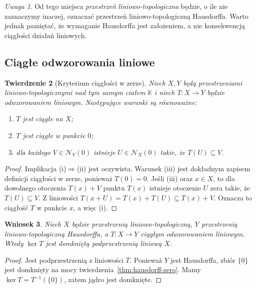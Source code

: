 \documentclass[11pt,a4paper]{article}
\numberwithin{equation}{section}
\theoremstyle{plain}
\newtheorem{twierdzenie}{Twierdzenie}[section]
\newtheorem{wniosek}[twierdzenie]{Wniosek}
\theoremstyle{definition}
\theoremstyle{remark}
\newtheorem{uwaga}[twierdzenie]{Uwaga}
\newcommand{\K}{\mathbb K}
\begin{document}
\begin{uwaga}
Od tego miejsca \emph{przestrzeń liniowo-topologiczna} będzie,
o ile nie zaznaczymy inaczej, oznaczać przestrzeń liniowo-topologiczną
Hausdorffa. Warto jednak pamiętać, że wymaganie Hausdorffa jest
założeniem, a nie konsekwencją ciągłości działań liniowych.
\end{uwaga}

\subsection{Ciągłe odwzorowania liniowe}

\begin{twierdzenie}[Kryterium ciągłości w zerze]\label{thm:linear-continuity-zero}
Niech $X,Y$ będą przestrzeniami liniowo-topologicznymi nad tym samym
ciałem $\K$ i niech $T\colon X\to Y$ będzie odwzorowaniem liniowym.
Następujące warunki są równoważne:
\begin{enumerate}[label=\textup{(\roman*)}]
 \item $T$ jest ciągłe na $X$;
 \item $T$ jest ciągłe w punkcie $0$;
 \item dla każdego $V\in\mathcal N_Y(0)$ istnieje
       $U\in\mathcal N_X(0)$ takie, że $T(U)\subseteq V$.
\end{enumerate}
\end{twierdzenie}
\begin{proof}
Implikacja (i)$\Rightarrow$(ii) jest oczywista.
Warunek (iii) jest dokładnym zapisem definicji ciągłości w zerze,
ponieważ $T(0)=0$.
Jeśli (iii) oraz $x\in X$, to dla dowolnego otoczenia
$T(x)+V$ punktu $T(x)$ istnieje otoczenie $U$ zera takie,
że $T(U)\subseteq V$. Z liniowości
$T(x+U)=T(x)+T(U)\subseteq T(x)+V$.
Oznacza to ciągłość $T$ w punkcie $x$, a więc (i).
\end{proof}

\begin{wniosek}\label{cor:kernel-closed}
Niech $X$ będzie przestrzenią liniowo-topologiczną, $Y$
przestrzenią liniowo-topologiczną Hausdorffa, a $T\colon X\to Y$
ciągłym odwzorowaniem liniowym. Wtedy $\ker T$ jest domkniętą
podprzestrzenią liniową $X$.
\end{wniosek}
\begin{proof}
Jest podprzestrzenią z liniowości $T$. Ponieważ $Y$ jest
Hausdorffa, zbiór $\{0\}$ jest domknięty na mocy
twierdzenia~\ref{thm:hausdorff-zero}. Mamy
$\ker T=T^{-1}(\{0\})$, zatem jądro jest domknięte.
\end{proof}
\end{document}
